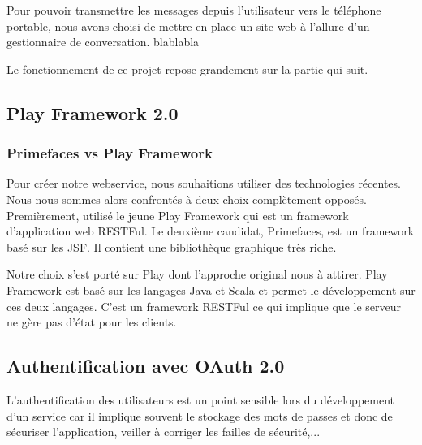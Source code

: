 Pour pouvoir transmettre les messages depuis l'utilisateur vers le téléphone portable, nous avons
choisi de mettre en place un site web à l'allure d'un gestionnaire de conversation. 
blablabla

Le fonctionnement de ce projet repose grandement sur la partie qui suit.
\\



\subsection{Play Framework 2.0}

\subsubsection{Primefaces vs Play Framework}

Pour créer notre webservice, nous souhaitions utiliser des technologies récentes. Nous nous sommes
alors confrontés à deux choix complètement opposés. Premièrement, utilisé le jeune Play Framework 
qui est un framework d'application web RESTFul. Le deuxième candidat, Primefaces, est un framework
basé sur les JSF. Il contient une bibliothèque graphique très riche.

Notre choix s'est porté sur Play dont l'approche original nous à attirer. Play Framework est basé sur
les langages Java et Scala et permet le développement sur ces deux langages. C'est un framework RESTFul
ce qui implique que le serveur ne gère pas d'état pour les clients.
\\


\subsection{Authentification avec OAuth 2.0} %

L'authentification des utilisateurs est un point sensible lors du développement d'un service car il
implique souvent le stockage des mots de passes et donc de sécuriser l'application, veiller à corriger
les failles de sécurité,... 


